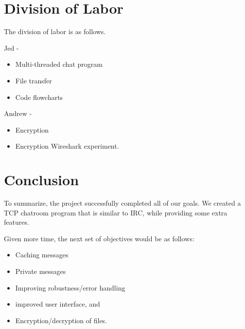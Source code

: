 \documentclass{article}
\begin{document}

\section{Division of Labor}

The division of labor is as follows.

Jed - 
\begin{itemize}
  \item Multi-threaded chat program
  \item File transfer
  \item Code flowcharts
\end{itemize}
Andrew - 
\begin{itemize}
  \item Encryption
  \item Encryption Wireshark experiment. 
\end{itemize}

\section{Conclusion}

To summarize, the project successfully completed all of our goals. We created a TCP chatroom program that is similar to IRC, while providing some extra features. 

Given more time, the next set of objectives would be as follows: 
\begin{itemize}
  \item Caching messages
  \item Private messages
  \item Improving robustness/error handling
  \item improved user interface, and
  \item Encryption/decryption of files. 
\end{itemize}





\end{document}

